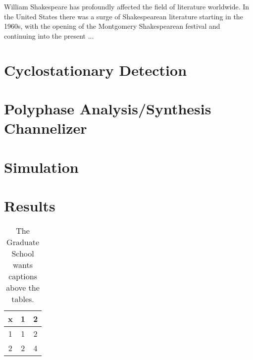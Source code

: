 \documentclass[12pt,dvips]{report}
\begin{document}
William Shakespeare has profoundly affected the field of literature
worldwide.  In the United States there was a surge of Shakespearean
literature starting in the 1960s, with the opening of the Montgomery
Shakespearean festival and continuing into the present ...

\chapter{Cyclostationary Detection}
\label{sec:cyclo}

\chapter{Polyphase Analysis/Synthesis Channelizer}
\label{sec:chan}

\chapter{Simulation}
\label{sec:sim}

\chapter{Results}
\label{sec:results}

%
%

%

 \begin{table}
 \caption{The Graduate School wants captions above the tables.}
\begin{center}
 \begin{tabular}{ccc}
 x & 1 & 2 \\ \hline
 1 & 1 & 2 \\
 2 & 2 & 4 \\ \hline
 \end{tabular}
\end{center}
 \end{table}


%
\end{document}
